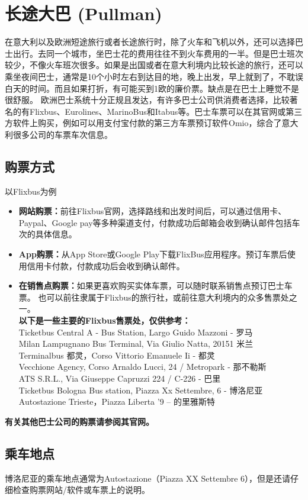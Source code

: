 \section{长途大巴 (Pullman)}
在意大利以及欧洲短途旅行或者长途旅行时，除了火车和飞机以外，还可以选择巴士出行。去同一个城市，坐巴士花的费用往往不到火车费用的一半。但是巴士班次较少，不像火车班次很多。如果是出国或者在意大利境内比较长途的旅行，还可以乘坐夜间巴士，通常是10个小时左右到达目的地，晚上出发，早上就到了，不耽误白天的时间。而且如果打折，有可能买到1欧的廉价票。缺点是在巴士上睡觉不是很舒服。
欧洲巴士系统十分正规且发达，有许多巴士公司供消费者选择，比较著名的有Flixbus、Eurolines、MarinoBus和Itabus等。巴士车票可以在其官网或第三方软件上购买，例如可以用支付宝付款的第三方车票预订软件Omio，综合了意大利很多公司的车票车次信息。
\subsection{购票方式}
以Flixbus为例
\begin{itemize}
\item  \textbf{网站购票：}前往Flixbus官网，选择路线和出发时间后，可以通过信用卡、Paypal、Google pay等多种渠道支付，付款成功后邮箱会收到确认邮件包括车次的具体信息。
\item  \textbf{App购票：}从App Store或Google Play下载FlixBus应用程序。预订车票后使用信用卡付款，付款成功后会收到确认邮件。
\item  \textbf{在销售点购票：}如果更喜欢购买实体车票，可以随时联系销售点预订巴士车票。 也可以前往隶属于Flixbus的旅行社，或前往意大利境内的众多售票处之一。\\
\textbf{以下是一些主要的Flixbus售票处，仅供参考：}\\
Ticketbus Central A - Bus Station, Largo Guido Mazzoni - 罗马\\
Milan Lampugnano Bus Terminal, Via Giulio Natta, 20151 米兰\\
Terminalbus 都灵，Corso Vittorio Emanuele Ii - 都灵\\
Vecchione Agency, Corso Arnaldo Lucci, 24 / Metropark - 那不勒斯\\
ATS S.R.L., Via Giuseppe Capruzzi 224 / C-226 - 巴里\\
Ticketbus Bologna Bus station, Piazza Xx Settembre, 6 - 博洛尼亚\\
Autostazione Trieste，Piazza Liberta '9 – 的里雅斯特\\
\end{itemize}
\textbf{有关其他巴士公司的购票请参阅其官网。}\\
\subsection{乘车地点}
博洛尼亚的乘车地点通常为Autostazione（Piazza XX Settembre 6），但是还请仔细检查购票网站/软件或车票上的说明。

